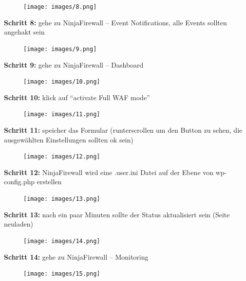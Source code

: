 \documentclass[a4paper]{article}
\begin{document}
\begin{figure}[H]
  \centering
  \texttt{[image: images/8.png]}
\end{figure}

\noindent
\textbf{Schritt 8:} gehe zu NinjaFirewall -- Event Notifications, alle Events sollten angehakt sein

\begin{figure}[H]
  \centering
  \texttt{[image: images/9.png]}
\end{figure}

\newpage

\noindent
\textbf{Schritt 9:} gehe zu NinjaFirewall -- Dashboard

\begin{figure}[H]
  \centering
  \texttt{[image: images/10.png]}
\end{figure}

\noindent
\textbf{Schritt 10:} klick auf \enquote{activate Full WAF mode}

\begin{figure}[H]
  \centering
  \texttt{[image: images/11.png]}
\end{figure}

\noindent
\textbf{Schritt 11:} speicher das Formular (runterscrollen um den Button zu sehen, die ausgewählten Einstellungen sollten ok sein)

\begin{figure}[H]
  \centering
  \texttt{[image: images/12.png]}
\end{figure}

\noindent
\textbf{Schritt 12:} NinjaFirewall wird eine .user.ini Datei auf der Ebene von wp-config.php erstellen

\begin{figure}[H]
  \centering
  \texttt{[image: images/13.png]}
\end{figure}

\newpage

\noindent
\textbf{Schritt 13:} nach ein paar Minuten sollte der Status aktualisiert sein (Seite neuladen)

\begin{figure}[H]
  \centering
  \texttt{[image: images/14.png]}
\end{figure}

\noindent
\textbf{Schritt 14:} gehe zu NinjaFirewall -- Monitoring

\begin{figure}[H]
  \centering
  \texttt{[image: images/15.png]}
\end{figure}
\end{document}
